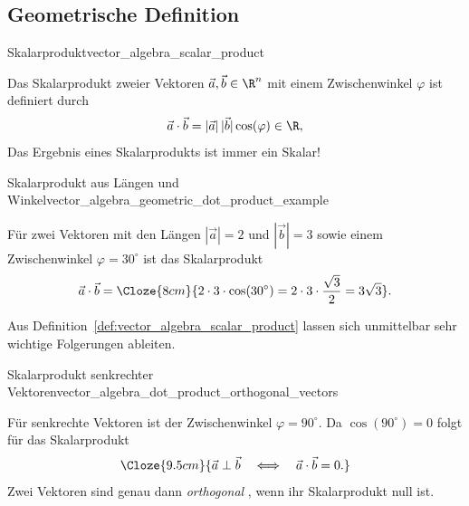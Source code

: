 \subsection{Geometrische Definition}
\label{subsec:vector_algebra_scalar_product_definition}

\begin{DefinitionBox}{Skalarprodukt}{vector_algebra_scalar_product}
  \begin{minipage}[c]{0.65\linewidth}
    Das Skalarprodukt  zweier Vektoren $\vec a,\vec b\in\R^n$
    mit einem Zwischenwinkel $\varphi$ ist definiert durch
    \[
      \vec a\cdot\vec b
      =|\vec a|\,|\vec b|\cos(\varphi)\in\R,
    \]
    Das Ergebnis eines Skalarprodukts ist immer ein Skalar!
  \end{minipage}\hfill
  \begin{minipage}[c]{0.33\linewidth}
    \centering
  \end{minipage}
\end{DefinitionBox}

\begin{ExampleBox}{Skalarprodukt aus Längen und Winkel}{vector_algebra_geometric_dot_product_example}
  \noindent
  \begin{minipage}[c]{0.65\linewidth}
    Für zwei Vektoren mit den Längen $|\vec a|=2$ und 
    $|\vec b|=3$ sowie einem Zwischenwinkel $\varphi=30^\circ$
    ist das Skalarprodukt
    \[
      \vec a\cdot\vec b
      =\Cloze{8cm}{
        2\cdot3\cdot\cos(30^\circ) = 2\cdot3\cdot\frac{\sqrt3}{2} = 3\sqrt3
        }.
    \]
  \end{minipage}\hfill
  \begin{minipage}[c]{0.33\linewidth}
    \centering
  \end{minipage}
\end{ExampleBox}

Aus Definition~\ref{def:vector_algebra_scalar_product} lassen sich unmittelbar
sehr wichtige Folgerungen ableiten.
\begin{KeyPointBox}{Skalarprodukt senkrechter Vektoren}{vector_algebra_dot_product_orthogonal_vectors}
  \begin{minipage}[c]{0.68\linewidth}
    Für senkrechte Vektoren ist der Zwischenwinkel $\varphi=90^\circ$.
    Da $\cos(90^\circ)=0$ folgt für das Skalarprodukt
    \[
      \Cloze{9.5cm}{%
        \vec a\perp\vec b
        \quad \Longleftrightarrow \quad
        \vec a\cdot\vec b=0.}
    \]
    Zwei Vektoren sind genau dann \emph{orthogonal} ,
    wenn ihr Skalarprodukt null ist.
  \end{minipage}\hfill
  \begin{minipage}[c]{0.27\linewidth}
    \centering
  \end{minipage}
\end{KeyPointBox}

